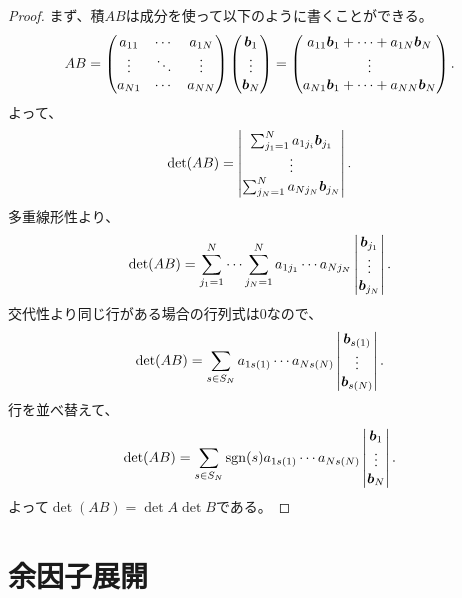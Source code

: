 \begin{proof}
まず、積$A B$は成分を使って以下のように書くことができる。
$$
A B =
\begin{pmatrix}
a_{1 1} & \cdots & a_{1 N}\\
\vdots  & \ddots & \vdots \\
a_{N 1} & \cdots & a_{N N}\\
\end{pmatrix}
\begin{pmatrix}
\vb*{b}_1\\
\vdots   \\
\vb*{b}_N\\
\end{pmatrix}
=
\begin{pmatrix}
a_{1 1}\vb*{b}_1+\cdots+a_{1 N}\vb*{b}_N \\
\vdots   \\
a_{N 1}\vb*{b}_1+\cdots+a_{N N}\vb*{b}_N \\
\end{pmatrix}.
$$
よって、
$$
\det(A B) =
\begin{vmatrix}
\sum_{j_1 = 1}^N a_{1 j_i}\vb*{b}_{j_1} \\
\vdots   \\
\sum_{j_N = 1}^N a_{N j_N}\vb*{b}_{j_N} \\
\end{vmatrix}.
$$
多重線形性より、
$$
\det(A B) =
\sum_{j_1 = 1}^N \cdots \sum_{j_N = 1}^N a_{1 j_1}\cdots a_{N j_N}\begin{vmatrix}\vb*{b}_{j_1} \\ \vdots \\ \vb*{b}_{j_N}\end{vmatrix}.
$$
交代性より同じ行がある場合の行列式は$0$なので、
$$
\det(A B) =
\sum_{s \in S_N} a_{1 s(1)}\cdots a_{N s(N)}\begin{vmatrix}\vb*{b}_{s(1)} \\ \vdots \\ \vb*{b}_{s(N)}\end{vmatrix}.
$$
行を並べ替えて、
$$
\det(A B) =
\sum_{s \in S_N} \operatorname{sgn}(s)a_{1 s(1)}\cdots a_{N s(N)}\begin{vmatrix}\vb*{b}_1 \\ \vdots \\ \vb*{b}_N\end{vmatrix}.
$$
よって$\det(A B) = \det A\det B$である。
\end{proof}

\section{余因子展開}

